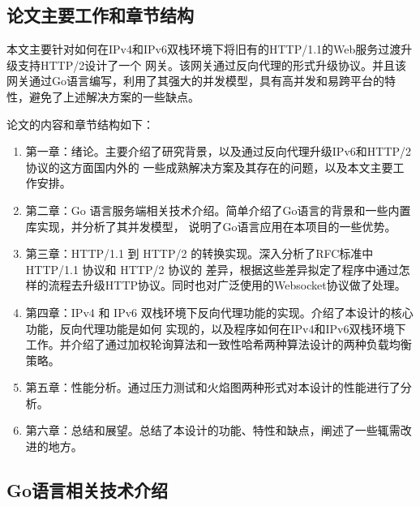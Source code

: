 \documentclass[twoside]{CUGThesis}
\begin{document}
	\subsection{论文主要工作和章节结构}
	本文主要针对如何在IPv4和IPv6双栈环境下将旧有的HTTP/1.1的Web服务过渡升级支持HTTP/2设计了一个
	网关。该网关通过反向代理的形式升级协议。并且该网关通过Go语言编写，利用了其强大的并发模型，具有高并发和易跨平台的特性，避免了上述解决方案的一些缺点。\par 
	论文的内容和章节结构如下：
	\begin{enumerate}
		\item 第一章：绪论。主要介绍了研究背景，以及通过反向代理升级IPv6和HTTP/2协议的这方面国内外的
		一些成熟解决方案及其存在的问题，以及本文主要工作安排。
		\item 第二章：Go 语言服务端相关技术介绍。简单介绍了Go语言的背景和一些内置库实现，并分析了其并发模型，
		说明了Go语言应用在本项目的一些优势。
		\item 第三章：HTTP/1.1 到 HTTP/2 的转换实现。深入分析了RFC标准中 HTTP/1.1 协议和 HTTP/2 协议的
		差异，根据这些差异拟定了程序中通过怎样的流程去升级HTTP协议。同时也对广泛使用的Websocket协议做了处理。
		\item 第四章：IPv4 和 IPv6 双栈环境下反向代理功能的实现。介绍了本设计的核心功能，反向代理功能是如何
		实现的，以及程序如何在IPv4和IPv6双栈环境下工作。并介绍了通过加权轮询算法和一致性哈希两种算法设计的两种负载均衡策略。
		\item 第五章：性能分析。通过压力测试和火焰图两种形式对本设计的性能进行了分析。
		\item 第六章：总结和展望。总结了本设计的功能、特性和缺点，阐述了一些辄需改进的地方。
	\end{enumerate}
	
	\begin{spacing}{2}
		\section{Go语言相关技术介绍}
	\end{spacing}
\end{document}
